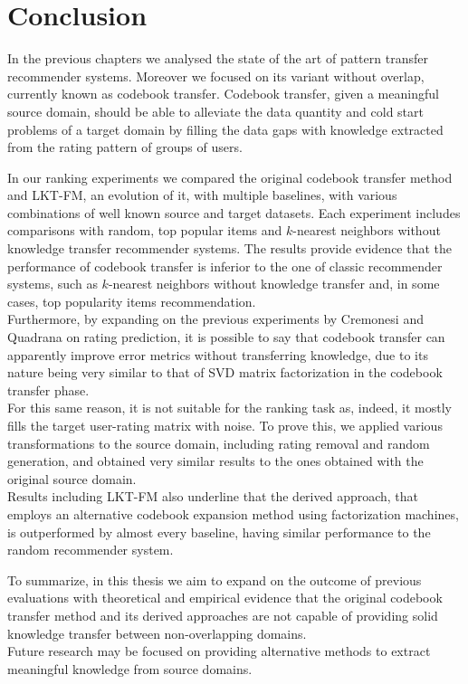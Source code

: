 \chapter{Conclusion}
\label{ch:conclusion}

In the previous chapters we analysed the state of the art of pattern transfer recommender systems. Moreover we focused on its variant without overlap, currently known as codebook transfer. Codebook transfer, given a meaningful source domain, should be able to alleviate the data quantity and cold start problems of a target domain by filling the data gaps with knowledge extracted from the rating pattern of groups of users.\par
In our ranking experiments we compared the original codebook transfer method and LKT-FM, an evolution of it, with multiple baselines, with various combinations of well known source and target datasets. Each experiment includes comparisons with random, top popular items and $k$-nearest neighbors without knowledge transfer recommender systems. The results provide evidence that the performance of codebook transfer is inferior to the one of classic recommender systems, such as $k$-nearest neighbors without knowledge transfer and, in some cases, top popularity items recommendation.\\
Furthermore, by expanding on the previous experiments by Cremonesi and Quadrana on rating prediction, it is possible to say that codebook transfer can apparently improve error metrics without transferring knowledge, due to its nature being very similar to that of SVD matrix factorization in the codebook transfer phase.\\
For this same reason, it is not suitable for the ranking task as, indeed, it mostly fills the target user-rating matrix with noise. To prove this, we applied various transformations to the source domain, including rating removal and random generation, and obtained very similar results to the ones obtained with the original source domain.\\
Results including LKT-FM also underline that the derived approach, that employs an alternative codebook expansion method using factorization machines, is outperformed by almost every baseline, having similar performance to the random recommender system.\par
To summarize, in this thesis we aim to expand on the outcome of previous evaluations with theoretical and empirical evidence that the original codebook transfer method and its derived approaches are not capable of providing solid knowledge transfer between non-overlapping domains.\\
Future research may be focused on providing alternative methods to extract meaningful knowledge from source domains.